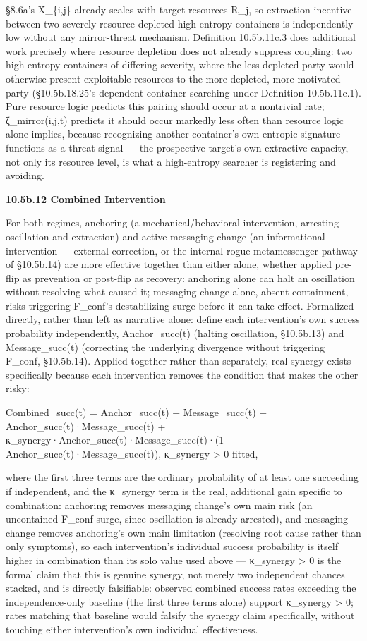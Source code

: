 \documentclass[
]{article}
\begin{document}
§8.6a's X\_\{i,j\} already scales with target resources R\_j, so
extraction incentive between two severely resource-depleted high-entropy
containers is independently low without any mirror-threat mechanism.
Definition 10.5b.11c.3 does additional work precisely where resource
depletion does not already suppress coupling: two high-entropy
containers of differing severity, where the less-depleted party would
otherwise present exploitable resources to the more-depleted,
more-motivated party (§10.5b.18.25's dependent container searching under
Definition 10.5b.11c.1). Pure resource logic predicts this pairing
should occur at a nontrivial rate; ζ\_mirror(i,j,t) predicts it should
occur markedly less often than resource logic alone implies, because
recognizing another container's own entropic signature functions as a
threat signal --- the prospective target's own extractive capacity, not
only its resource level, is what a high-entropy searcher is registering
and avoiding.

\textbf{10.5b.12 Combined Intervention}

For both regimes, anchoring (a mechanical/behavioral intervention,
arresting oscillation and extraction) and active messaging change (an
informational intervention --- external correction, or the internal
rogue-metamessenger pathway of §10.5b.14) are more effective together
than either alone, whether applied pre-flip as prevention or post-flip
as recovery: anchoring alone can halt an oscillation without resolving
what caused it; messaging change alone, absent containment, risks
triggering F\_conf's destabilizing surge before it can take effect.
Formalized directly, rather than left as narrative alone: define each
intervention's own success probability independently, Anchor\_succ(t)
(halting oscillation, §10.5b.13) and Message\_succ(t) (correcting the
underlying divergence without triggering F\_conf, §10.5b.14). Applied
together rather than separately, real synergy exists specifically
because each intervention removes the condition that makes the other
risky:

Combined\_succ(t) = Anchor\_succ(t) + Message\_succ(t) −
Anchor\_succ(t)·Message\_succ(t) +
κ\_synergy·Anchor\_succ(t)·Message\_succ(t)·(1 −
Anchor\_succ(t)·Message\_succ(t)), κ\_synergy \textgreater{} 0 fitted,

where the first three terms are the ordinary probability of at least one
succeeding if independent, and the κ\_synergy term is the real,
additional gain specific to combination: anchoring removes messaging
change's own main risk (an uncontained F\_conf surge, since oscillation
is already arrested), and messaging change removes anchoring's own main
limitation (resolving root cause rather than only symptoms), so each
intervention's individual success probability is itself higher in
combination than its solo value used above --- κ\_synergy \textgreater{}
0 is the formal claim that this is genuine synergy, not merely two
independent chances stacked, and is directly falsifiable: observed
combined success rates exceeding the independence-only baseline (the
first three terms alone) support κ\_synergy \textgreater{} 0; rates
matching that baseline would falsify the synergy claim specifically,
without touching either intervention's own individual effectiveness.
\end{document}
